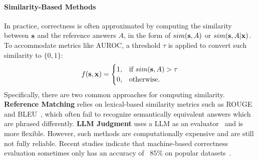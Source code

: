 \paragraph{Similarity-Based Methods} In practice, correctness is often approximated by computing the similarity between $\mathbf{s}$ and the reference answers $A$, in the form of $sim(\mathbf{s},A)$ or $sim(\mathbf{s},A|\mathbf{x})$. 
    To accommodate metrics like AUROC, a threshold $\tau$ is applied to convert such similarity to $\{0,1\}$:
     \begin{equation}
        f(\mathbf{s}, \mathbf{x}) =
        \begin{cases} 
          1, & \text{if } sim(\mathbf{s}, A) > \tau \\ 
          0, & \text{otherwise}.
        \end{cases}\label{eq:correctness}
    \end{equation}
    Specifically, there are two common approaches for computing similarity.
    \textbf{Reference Matching} relies on lexical-based similarity metrics such as ROUGE and BLEU~\cite{hu2024unveiling,aynetdinov2024semscore,kuhn2023semantic}, which often fail to recognize semantically equivalent answers which are phrased differently.
    \textbf{LLM Judgment} uses a LLM as an evaluator~\cite{MCConf-pmlr-v239-ren23a,li2024generation,tan2024judgebench} and is more flexible. 
    However, such methods are computationally expensive and are still not fully reliable. 
    Recent studies indicate that machine-based correctness evaluation sometimes only has an accuracy of ~85\% on popular datasets~\cite{kuhn2023semantic,CSL}.



